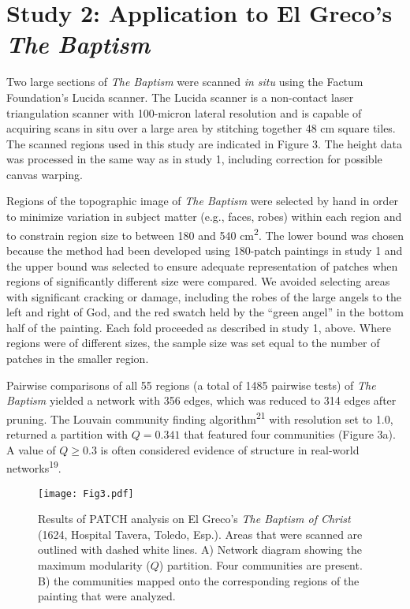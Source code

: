 \documentclass[11pt]{article}
\begin{document}
\section*{Study 2: Application to El Greco's {\em The Baptism}}

Two large sections of \emph{The Baptism} were scanned \emph{in situ}
using the Factum Foundation's Lucida scanner. The Lucida scanner is a
non-contact laser triangulation scanner with 100-micron lateral
resolution and is capable of acquiring scans in situ over a large area
by stitching together 48 cm square tiles. The scanned regions used in
this study are indicated in Figure 3. The height data was processed in
the same way as in study 1, including correction for possible canvas
warping.

Regions of the topographic image of \emph{The Baptism} were selected by
hand in order to minimize variation in subject matter (e.g., faces,
robes) within each region and to constrain region size to between 180
and 540 cm\textsuperscript{2}. The lower bound was chosen because the
method had been developed using 180-patch paintings in study 1 and the
upper bound was selected to ensure adequate representation of patches
when regions of significantly different size were compared. We avoided
selecting areas with significant cracking or damage, including the robes
of the large angels to the left and right of God, and the red swatch
held by the ``green angel'' in the bottom half of the painting. Each
fold proceeded as described in study 1, above. Where regions were of
different sizes, the sample size was set equal to the number of patches
in the smaller region.

Pairwise comparisons of all 55 regions (a total of 1485 pairwise tests)
of \emph{The Baptism} yielded a network with 356 edges, which was
reduced to 314 edges after pruning. The Louvain community finding
algorithm\textsuperscript{21} with resolution set to 1.0, returned a
partition with $Q=0.341$ that featured four communities (Figure
3a). A value of $Q \ge  0.3$ is often considered evidence
of structure in real-world networks\textsuperscript{19}.

\begin{figure}
\texttt{[image: Fig3.pdf]}
\caption{Results of PATCH analysis on El Greco's \emph{The Baptism of Christ}
(1624, Hospital Tavera, Toledo, Esp.). Areas that were scanned are
outlined with dashed white lines. A) Network diagram showing the
maximum modularity ($Q$) partition. Four communities are present. B) the
communities mapped onto the corresponding regions of the painting that
were analyzed.}
\end{figure}
\end{document}
